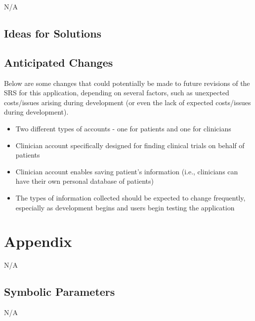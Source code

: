 \documentclass[12pt, titlepage]{article}
\begin{document}
N/A

\subsection{Ideas for Solutions}

\subsection{Anticipated Changes}

Below are some changes that could potentially be made to future 
revisions of the SRS for this application, depending on several factors,
such as unexpected costs/issues arising during development (or even the lack 
of expected costs/issues during development).

\begin{itemize}
    \item Two different types of accounts - one for patients and one for clinicians
    \item Clinician account specifically designed for finding clinical trials on behalf of patients
    \item Clinician account enables saving patient's information (i.e., clinicians can have their own personal database of patients)
    \item The types of information collected should be expected to change frequently, especially as development begins and users begin testing the application
\end{itemize}





\newpage

\section{Appendix}

N/A

\subsection{Symbolic Parameters}

N/A
\end{document}
